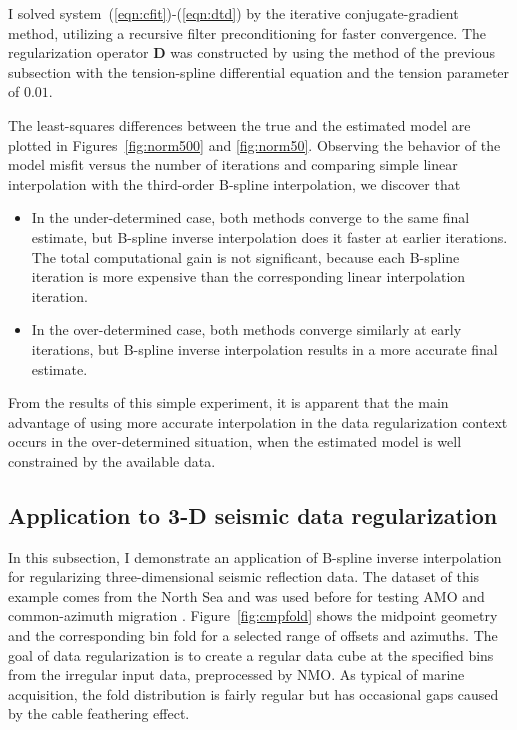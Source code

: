 \par
I solved system~(\ref{eqn:cfit})-(\ref{eqn:dtd}) by the iterative
conjugate-gradient method, utilizing a recursive filter
preconditioning \cite[]{Fomel.sep.94.sergey1} for faster convergence.
The regularization operator $\mathbf{D}$ was constructed by using the
method of the previous subsection with the tension-spline differential
equation \cite[]{GEO55-03-02930305,Fomel.sep.103.sergey1} and the
tension parameter of $0.01$.
\par
The least-squares differences between the true and the estimated model
are plotted in Figures~\ref{fig:norm500} and \ref{fig:norm50}.
Observing the behavior of the model misfit versus the number of
iterations and comparing simple linear interpolation with the
third-order B-spline interpolation, we discover that
\begin{itemize}
\item In the under-determined case, both methods converge to the same
  final estimate, but B-spline inverse interpolation does it faster at
  earlier iterations. The total computational gain is not significant,
  because each B-spline iteration is more expensive than the
  corresponding linear interpolation iteration.
\item In the over-determined case, both methods converge similarly at
  early iterations, but B-spline inverse interpolation results in a
  more accurate final estimate.
\end{itemize}
From the results of this simple experiment, it is apparent that the
main advantage of using more accurate interpolation in the data
regularization context occurs in the over-determined situation, when
the estimated model is well constrained by the available data.


\subsection{Application to 3-D seismic data regularization}

In this subsection, I demonstrate an application of B-spline inverse
interpolation for regularizing three-dimensional seismic reflection
data. The dataset of this example comes from the North Sea and was
used before for testing AMO \cite[]{GEO63-02-05740588} and common-azimuth
migration \cite[]{Biondi.sep.93.1}. Figure~\ref{fig:cmpfold} shows the
midpoint geometry and the corresponding bin fold for a selected range
of offsets and azimuths. The goal of data regularization is to create
a regular data cube at the specified bins from the irregular input
data, preprocessed by NMO. As typical of marine acquisition, the fold
distribution is fairly regular but has occasional gaps caused by the
cable feathering effect.

